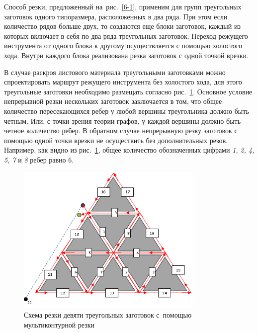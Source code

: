 \documentclass[11pt,twoside,openany]{report}
\begin{document}
Способ резки, предложенный
на~рис.~\ref{6-1},
применим для групп треугольных заготовок одного типоразмера,
расположенных в два ряда.
При этом если количество рядов больше двух,
то создаются еще блоки заготовок,
каждый из которых включает в себя по два ряда треугольных заготовок.
Переход режущего инструмента от одного блока к другому
осуществляется с помощью холостого хода.
Внутри каждого блока реализована резка заготовок с одной точкой врезки.

В случае раскроя листового материала треугольными
заготовками можно спроектировать маршрут режущего
инструмента без холостого хода,
для этого треугольные заготовки необходимо
размещать согласно рис.~\ref{3-10}.
Основное условие непрерывной резки нескольких
заготовок заключается в том,
что общее количество пересекающихся ребер у
любой вершины треугольника должно быть четным.
Или, с точки зрения теории графов,
у каждой вершины
должно быть четное количество ребер.
В обратном случае непрерывную резку заготовок
с помощью одной точки врезки не осуществить
без дополнительных резов.
Например, как видно из рис.~\ref{3-10},
общее количество обозначенных цифрами
{\it 1, 2, 4, 5, 7} и {\it 8} ребер равно 6.

\begin{figure}[h]
  \begin{center}
  \includegraphics[width=0.8\textwidth]{3-10.png}
  \caption{
    Схема резки девяти треугольных заготовок
    с~помощью мультиконтурной резки}
  \label{3-10}
  \end{center}
\end{figure}
\end{document}

